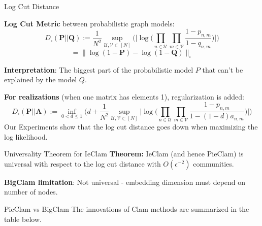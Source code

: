 \documentclass[final]{beamer}
\newlength{\colwidth}
\begin{document}
\begin{frame}[t]
\begin{columns}[t]
\begin{column}{\colwidth}

  \begin{block}{Log Cut Distance}

    \textbf{Log Cut Metric} between probabilistic graph models:
    \[
        D_{\square}(\mathbf{P} || \mathbf{Q}):=  \frac{1}{N^2}\sup_{\mathcal{U},\mathcal{V}\subset[N]}\Bigg(\Big|\log\Big(\prod_{n\in \mathcal{U}}\prod_{m\in \mathcal{V}}
\frac{1-p_{n,m}}{1-q_{n,m}}\Big)\Big|\Bigg)\]
    \[= \|\log(1-\mathbf{P})- \log(1-\mathbf{Q}) \|_{\square}\]
    
    \textbf{Interpretation}: The biggest part of the probabilistic model $P$ that can't be explained by the model $Q$.
    
    \textbf{For realizations} (when one matrix has elements 1), regularization is added:
    \[
    D_{\square}(\mathbf{P} || \mathbf{A}):= 
    \inf_{0< d\leq1} \Bigg( d+ \frac{1}{N^2}\sup_{\mathcal{U},\mathcal{V}\subset[N]}\Big|\log\Big(\prod_{n\in \mathcal{U}}\prod_{m\in \mathcal{V}}
\frac{1-p_{n,m}}{1-(1-d)a_{n,m}}\Big)\Big|\Bigg)
    \]
  Our Experiments show that the log cut distance goes down when maximizing the log likelihood.

  \end{block}
\begin{block}{Universality Theorem for IeClam}
  \textbf{Theorem:} IeClam (and hence PieClam) is universal with respect to the log cut distance with $O(\epsilon^{-2})$ communities.

 \textbf{BigClam limitation}: Not universal - embedding dimension must depend on number of nodes.
\end{block}

  \begin{block}{PieClam vs BigClam}
    The innovations of Clam methods are summarized in the table below.
 \vspace{1em}
    
 \begin{table}[h]
  \centering
  \renewcommand{\arraystretch}{1.2}
\end{table}


\end{block}
\end{column}
\end{columns}
\end{frame}
\end{document}
